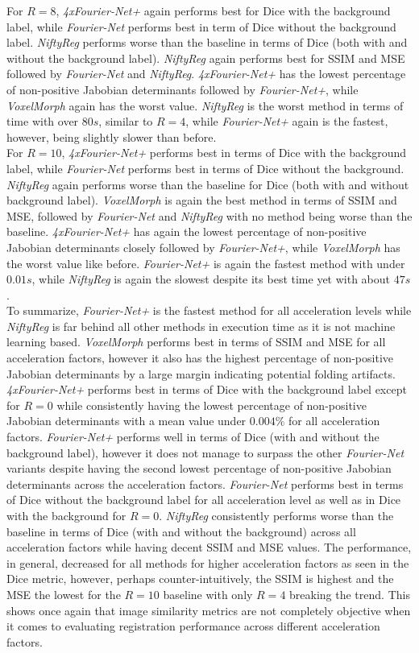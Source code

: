 \documentclass[english,version-2022-01]{uzl-thesis} %
\begin{document}
For $R=8$, \emph{4xFourier-Net+} again performs best for Dice with the background label, while \emph{Fourier-Net} performs best in term of Dice without the background label. \emph{NiftyReg} performs worse than the baseline in terms of Dice (both with and without the background label). \emph{NiftyReg} again performs best for SSIM and MSE followed by \emph{Fourier-Net} and \emph{NiftyReg}. \emph{4xFourier-Net+} has the lowest percentage of non-positive Jabobian determinants followed by \emph{Fourier-Net+}, while \emph{VoxelMorph} again has the worst value. \emph{NiftyReg} is the worst method in terms of time with over $80s$, similar to $R=4$, while \emph{Fourier-Net+} again is the fastest, however, being slightly slower than before.\\
For $R=10$, \emph{4xFourier-Net+} performs best in terms of Dice with the background label, while \emph{Fourier-Net} performs best in terms of Dice without the background. \emph{NiftyReg} again performs worse than the baseline for Dice (both with and without background label). \emph{VoxelMorph} is again the best method in terms of SSIM and MSE, followed by \emph{Fourier-Net} and \emph{NiftyReg} with no method being worse than the baseline. \emph{4xFourier-Net+} has again the lowest percentage of non-positive Jabobian determinants closely followed by \emph{Fourier-Net+}, while \emph{VoxelMorph} has the worst value like before. \emph{Fourier-Net+} is again the fastest method with under $0.01s$, while \emph{NiftyReg} is again the slowest despite its best time yet with about $47s$.\\
To summarize, \emph{Fourier-Net+} is the fastest method for all acceleration levels while \emph{NiftyReg} is far behind all other methods in 
execution time as it is not machine learning based. \emph{VoxelMorph} performs best in terms of SSIM and MSE for all acceleration factors, however it also has the highest percentage of non-positive Jabobian determinants by a large margin indicating potential folding artifacts. \emph{4xFourier-Net+} performs best in terms of Dice with the background label except for $R=0$ while consistently having the lowest percentage of non-positive Jabobian determinants with a mean value under $0.004\%$ for all acceleration factors. \emph{Fourier-Net+} performs well in terms of Dice (with and without the background label), however it does not manage to surpass the other \emph{Fourier-Net} variants despite having the second lowest percentage of non-positive Jabobian determinants across the acceleration factors. \emph{Fourier-Net} performs best in terms of Dice without the background label for all acceleration level as well as in Dice with the background for $R=0$. \emph{NiftyReg} consistently performs worse than the baseline in terms of Dice (with and without the background) across all acceleration factors while having decent SSIM and MSE values. The performance, in general, decreased for all methods for higher acceleration factors as seen in the Dice metric, however, perhaps counter-intuitively, the SSIM is highest and the MSE the lowest for the $R=10$ baseline with only $R=4$ breaking the trend. This shows once again that image similarity metrics are not completely objective when it comes to evaluating registration performance across different acceleration factors.\\
\end{document}
